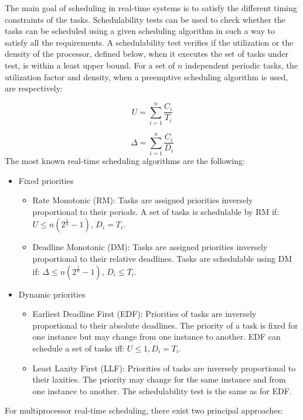 The main goal of scheduling in real-time systems is to satisfy the different timing constraints of the tasks. Schedulability tests can be used to check whether the tasks can be scheduled using a given scheduling algorithm in such a way to satisfy all the requirements. A schedulability test verifies if the utilization or the density of the processor, defined below, when it executes the set of tasks under test, is within a least upper bound. For a set of $n$ independent periodic tasks, the utilization factor and density, when a preemptive scheduling algorithm is used, are respectively:

\begin{equation}
U = \sum_{i=1}^{n}\frac{C_i}{T_i}
\end{equation}

\begin{equation}
\Delta = \sum_{i=1}^{n}\frac{C_i}{D_i}
\end{equation}
The most known real-time scheduling algorithms are the following:

\begin{itemize}
\item Fixed priorities
\begin{itemize}
\item Rate Monotonic (RM): Tasks are assigned priorities inversely proportional to their periods. A set of tasks is schedulable by RM if: $U \leq n(2^{\frac{1}{n}}-1)$, $D_i = T_i$. 
\item Deadline Monotonic (DM): Tasks are assigned priorities inversely proportional to their relative deadlines. Tasks are schedulable using DM if: $\Delta \leq n(2^{\frac{1}{n}}-1)$, $D_i \leq T_i$. 
\end{itemize}
\item Dynamic priorities
\begin{itemize}
\item Earliest Deadline First (EDF): Priorities of tasks are inversely proportional to their absolute deadlines. The priority of a task is fixed for one instance but may change from one instance to another. EDF can schedule a set of tasks iff: $U \leq 1, D_i = T_i$.
\item Least Laxity First (LLF): Priorities of tasks are inversely proportional to their laxities. The priority may change for the same instance and from one instance to another. The schedulability test is the same as for EDF.
\end{itemize}
\end{itemize}
 For multiprocessor real-time scheduling, there exist two principal approaches:

